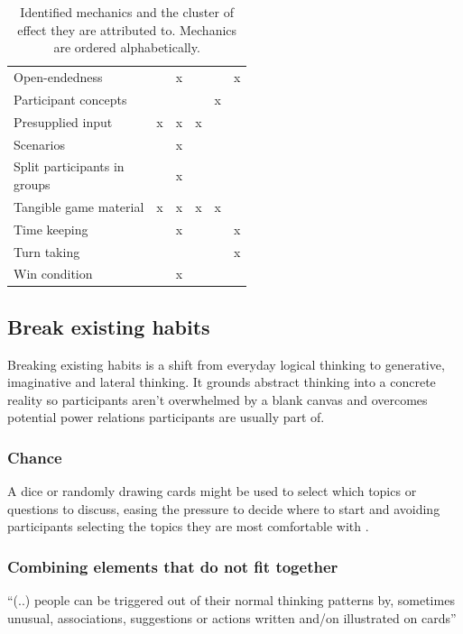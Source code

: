 \documentclass[draft,twoside]{vutinfth}
\begin{document}
\begin{table}
\begin{tabular}{l|ccccc}
                Open-endedness          &   & x &   &   & x \\
                Participant concepts    &   &   &   & x &   \\
                Presupplied input       & x & x & x &   &   \\
                Scenarios               &   & x &   &   &   \\
                \makecell[l]{Split participants in\\groups}    &   & x &   &   &   \\
                Tangible game material  & x & x & x & x &   \\
                Time keeping            &   & x &   &   & x \\
                Turn taking             &   &   &   &   & x \\
                Win condition           &   & x &   &   &   \\


            \bottomrule
        \end{tabular}
        \caption{Identified mechanics and the cluster of effect they are attributed to. Mechanics are ordered alphabetically.}
        \label{tab:mechanics}
    \end{table}

        \subsection{Break existing habits}
        Breaking existing habits is a shift from everyday logical thinking to generative, 
        imaginative and lateral thinking. It grounds abstract thinking into a concrete 
        reality so participants aren't overwhelmed by a blank canvas and overcomes potential 
        power relations participants are usually part of. 

            \subsubsection{Chance}
            A dice or randomly drawing cards might be used to select which topics or questions to discuss, 
            easing the pressure to decide where to start and avoiding participants selecting the topics 
            they are most comfortable with \cite{brandtDesigningExploratoryDesign2006, hatamiFacilitatingServiceInteractions2016,bunaesRulesPlayBalance2024}. 
            
            \subsubsection{Combining elements that do not fit together}
            ``(..) people can be triggered out of their normal thinking patterns by, sometimes unusual, 
            associations, suggestions or actions written and/on illustrated on cards'' \cite{royCardbasedDesignTools2019}
\end{document}
